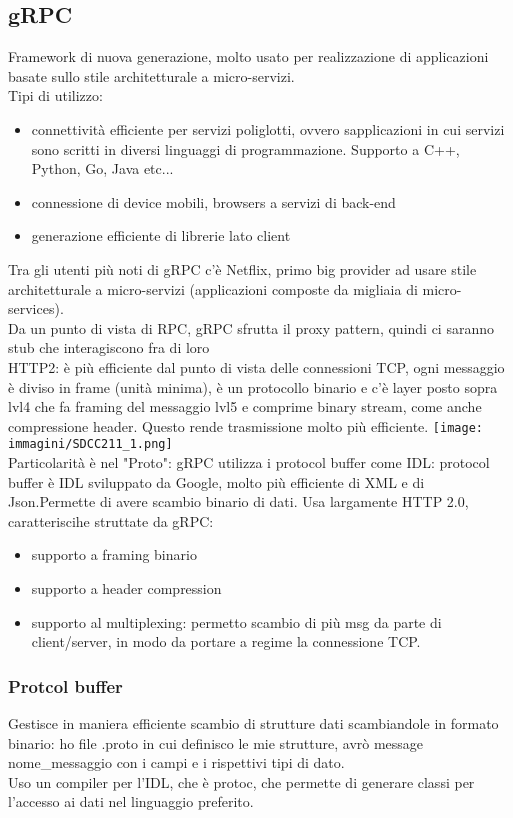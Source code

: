 \documentclass{article}
\begin{document}
\subsection{gRPC}
Framework di nuova generazione, molto usato per realizzazione di applicazioni basate sullo stile architetturale a micro-servizi.\\ Tipi di utilizzo:
\begin{itemize}
\item connettività efficiente per servizi poliglotti, ovvero sapplicazioni in cui servizi sono scritti in diversi linguaggi di programmazione. Supporto a C++, Python, Go, Java etc...
\item connessione di device mobili, browsers a servizi di back-end
\item generazione efficiente di librerie lato client
\end{itemize}
Tra gli utenti più noti di gRPC c'è Netflix, primo big provider ad usare stile architetturale a micro-servizi (applicazioni composte da migliaia di micro-services).\\ Da un punto di vista di RPC, gRPC sfrutta il proxy pattern, quindi ci saranno stub che interagiscono fra di loro\\
HTTP2: è più efficiente dal punto di vista delle connessioni TCP, ogni messaggio è diviso in frame (unità minima), è un protocollo binario e c'è layer posto sopra lvl4 che fa framing del messaggio lvl5 e comprime binary stream, come anche compressione header. Questo rende trasmissione molto più efficiente.
\texttt{[image: immagini/SDCC211\_1.png]}\\ Particolarità è nel "Proto": gRPC utilizza i protocol buffer come IDL: protocol buffer è IDL sviluppato da Google, molto più efficiente di XML e di Json.Permette di avere scambio binario di dati. Usa largamente HTTP 2.0, caratteriscihe struttate da gRPC:
\begin{itemize}
\item supporto a framing binario
\item supporto a header compression
\item supporto al multiplexing: permetto scambio di più msg da parte di client/server, in modo da portare a  regime la connessione TCP.
\end{itemize}
\subsubsection{Protcol buffer}
Gestisce in maniera efficiente scambio di strutture dati scambiandole in formato binario: ho file .proto in cui definisco le mie strutture, avrò message nome\_messaggio con i campi e i rispettivi tipi di dato.\\ Uso un compiler per l'IDL, che è protoc, che permette di generare classi per l'accesso ai dati nel linguaggio preferito.
\end{document}
